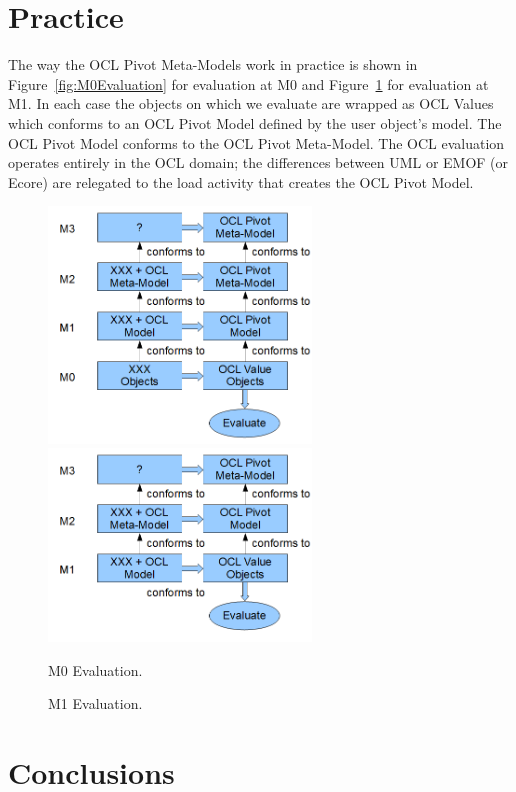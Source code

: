 \documentclass{eceasst}
\begin{document}
\section{Practice}

The way the OCL Pivot Meta-Models work in practice is shown in Figure~\ref{fig:M0Evaluation} for evaluation at M0 and Figure~\ref{fig:M1Evaluation} for evaluation at M1. In each case the objects on which we evaluate are wrapped as OCL Values which conforms to an OCL Pivot Model defined by the user object's model. The OCL Pivot Model conforms to the OCL Pivot Meta-Model. The OCL evaluation operates entirely in the OCL domain; the differences between UML or EMOF (or Ecore) are relegated to the load activity that creates the OCL Pivot Model.

\begin{figure}
  \begin{center}
    \includegraphics[width=2.75in]{M0Evaluation.png}
    \includegraphics[width=2.75in]{M1Evaluation.png}
  \end{center}
  \caption{M0 Evaluation.}
  \label{fig:M0Evaluation}
  \caption{M1 Evaluation.}
  \label{fig:M1Evaluation}
\end{figure}

\section{Conclusions}
\end{document}
